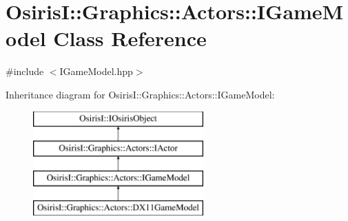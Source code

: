 \hypertarget{class_osiris_i_1_1_graphics_1_1_actors_1_1_i_game_model}{\section{Osiris\-I\-:\-:Graphics\-:\-:Actors\-:\-:I\-Game\-Model Class Reference}
\label{class_osiris_i_1_1_graphics_1_1_actors_1_1_i_game_model}
}


{\ttfamily \#include $<$I\-Game\-Model.\-hpp$>$}

Inheritance diagram for Osiris\-I\-:\-:Graphics\-:\-:Actors\-:\-:I\-Game\-Model\-:\begin{figure}[H]
\begin{center}
\leavevmode
\includegraphics[height=4.000000cm]{class_osiris_i_1_1_graphics_1_1_actors_1_1_i_game_model}
\end{center}
\end{figure}
